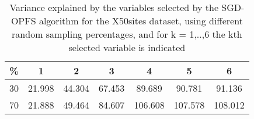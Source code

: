 \begin{table}
	\begin{center}
		\begin{tabular}{c c c c c c c}
			\% & 1 & 2 & 3 & 4 & 5 & 6 \\
			\hline
			30 & 21.998 & 44.304 & 67.453 & 89.689 & 90.781 & 91.136 \\
			70 & 21.888 & 49.464 & 84.607 & 106.608 & 107.578 & 108.012 \\
		\end{tabular}
	\end{center}
	\caption{Variance explained by the variables selected by the SGD-OPFS algorithm for the X50sites dataset, using different random sampling percentages, and for k = 1,..,6 the kth selected variable is indicated}
\end{table}